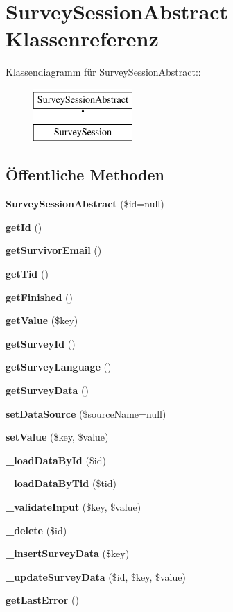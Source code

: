 \section{SurveySessionAbstract Klassenreferenz}
\label{classSurveySessionAbstract}
Klassendiagramm für SurveySessionAbstract::\begin{figure}[H]
\begin{center}
\leavevmode
\includegraphics[height=2cm]{classSurveySessionAbstract}
\end{center}
\end{figure}
\subsection*{Öffentliche Methoden}
\begin{CompactItemize}
\item 
{\bf SurveySessionAbstract} (\$id=null)
\item 
{\bf getId} ()
\item 
{\bf getSurvivorEmail} ()
\item 
{\bf getTid} ()
\item 
{\bf getFinished} ()
\item 
{\bf getValue} (\$key)
\item 
{\bf getSurveyId} ()
\item 
{\bf getSurveyLanguage} ()
\item 
{\bf getSurveyData} ()
\item 
{\bf setDataSource} (\$sourceName=null)
\item 
{\bf setValue} (\$key, \$value)
\item 
{\bf \_\-loadDataById} (\$id)
\item 
{\bf \_\-loadDataByTid} (\$tid)
\item 
{\bf \_\-validateInput} (\$key, \$value)
\item 
{\bf \_\-delete} (\$id)
\item 
{\bf \_\-insertSurveyData} (\$key)
\item 
{\bf \_\-updateSurveyData} (\$id, \$key, \$value)
\item 
{\bf getLastError} ()
\end{CompactItemize}
